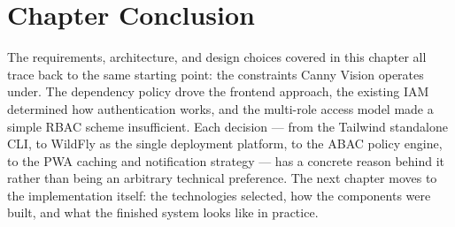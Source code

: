 \section{Chapter Conclusion}

The requirements, architecture, and design choices covered in this chapter all trace back
to the same starting point: the constraints Canny Vision operates under. The dependency
policy drove the frontend approach, the existing IAM determined how authentication works,
and the multi-role access model made a simple RBAC scheme insufficient. Each decision ---
from the Tailwind standalone CLI, to WildFly as the single deployment platform, to the
ABAC policy engine, to the PWA caching and notification strategy --- has a concrete reason
behind it rather than being an arbitrary technical preference.
The next chapter moves to the implementation itself: the technologies selected, how the
components were built, and what the finished system looks like in practice.

